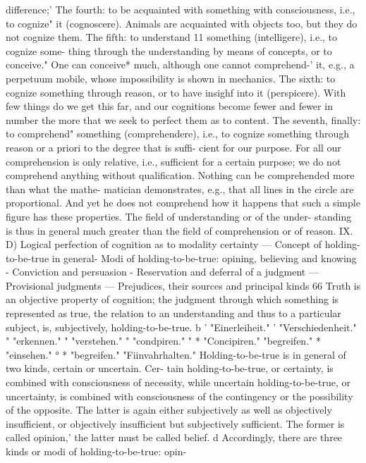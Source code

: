 difference;'
The fourth: to be acquainted with something with consciousness, i.e., to
cognize" it (cognoscere). Animals are acquainted with objects too, but they do
not cognize them.
The fifth: to understand 11 something (intelligere), i.e., to cognize some-
thing through the understanding by means of concepts, or to conceive." One can
conceive* much, although one cannot comprehend-' it, e.g., a perpetuum
mobile, whose impossibility is shown in mechanics.
The sixth: to cognize something through reason, or to have insighf into
it (perspicere). With few things do we get this far, and our cognitions
become fewer and fewer in number the more that we seek to perfect them
as to content.
The seventh, finally: to comprehend" something (comprehendere), i.e., to
cognize something through reason or a priori to the degree that is suffi-
cient for our purpose. For all our comprehension is only relative, i.e.,
sufficient for a certain purpose; we do not comprehend anything without
qualification. Nothing can be comprehended more than what the mathe-
matician demonstrates, e.g., that all lines in the circle are proportional.
And yet he does not comprehend how it happens that such a simple
figure has these properties. The field of understanding or of the under-
standing is thus in general much greater than the field of comprehension
or of reason.
IX.
D) Logical perfection of cognition as to modality certainty — Concept of
holding-to-be-true in general- Modi of holding-to-be-true:
opining, believing and knowing - Conviction and persuasion -
Reservation and deferral of a judgment — Provisional judgments —
Prejudices, their sources and principal kinds
66
Truth is an objective property of cognition; the judgment through which
something is represented as true, the relation to an understanding and thus
to a particular subject, is, subjectively, holding-to-be-true. b
'
"Einerleiheit."
' "Verschiedenheit."
" "erkennen."
" "verstehen."
" "condpiren."
"
* "Concipiren."
"begreifen."
* "einsehen."
°
* "begreifen."
"Fiinvahrhalten."
Holding-to-be-true is in general of two kinds, certain or uncertain. Cer-
tain holding-to-be-true, or certainty, is combined with consciousness of
necessity, while uncertain holding-to-be-true, or uncertainty, is combined
with consciousness of the contingency or the possibility of the opposite.
The latter is again either subjectively as well as objectively insufficient, or
objectively insufficient but subjectively sufficient. The former is called opinion,'
the latter must be called belief. d
Accordingly, there are three kinds or modi of holding-to-be-true: opin-
